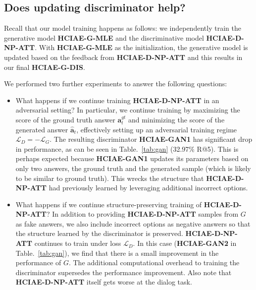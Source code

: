 \documentclass{article}
\newcommand{\ourenc}{HCIAE\xspace}
\begin{document}
\subsection{Does updating discriminator help?}


Recall that our model training happens as follows: we independently train the generative model \textbf{\ourenc-G-MLE} 
and the discriminative model \textbf{\ourenc-D-NP-ATT}. With \textbf{\ourenc-G-MLE} as the initialization, 
the generative model is updated based on the feedback from \textbf{\ourenc-D-NP-ATT} and this results in our final \textbf{\ourenc-G-DIS}. 

We performed two further experiments to answer the following questions:
\begin{itemize}
\item What happens if we continue training \textbf{\ourenc-D-NP-ATT} in an adversarial setting? 
In particular, we continue training by maximizing the score of the ground truth answer $\bm{a}^{gt}_t$
and minimizing the score 
of the generated answer $\bm{\hat{a}}_t$, effectively setting up an adversarial training regime 
$\mathcal{L}_{D} = -\mathcal{L}_{G}$. The resulting 
discriminator \textbf{\ourenc-GAN1} has significant drop in performance, as can be seen in 
Table.~\ref{tab:gan} (32.97\% R@5). This is perhaps expected because \textbf{\ourenc-GAN1} 
updates its parameters based on only two answers, the ground truth and the generated 
sample (which is likely to be similar to ground truth). This wrecks the structure that 
\textbf{\ourenc-D-NP-ATT} had previously learned by leveraging additional incorrect options.

\item What happens if we continue structure-preserving training of \textbf{\ourenc-D-NP-ATT}? 
In addition to providing \textbf{\ourenc-D-NP-ATT} samples from $G$ as fake answers, we also include 
incorrect options as negative answers so that the structure learned by the discriminator 
is preserved. \textbf{\ourenc-D-NP-ATT} continues to train under loss $\mathcal{L}_{D}$.  
In this case (\textbf{\ourenc-GAN2} in  Table.~\ref{tab:gan}), we find that there is a small 
improvement in the performance of $G$. The additional computational overhead to training 
the discriminator supersedes the performance improvement. Also note that \textbf{\ourenc-D-NP-ATT} 
itself gets worse at the dialog task. 
\end{itemize}
\end{document}
